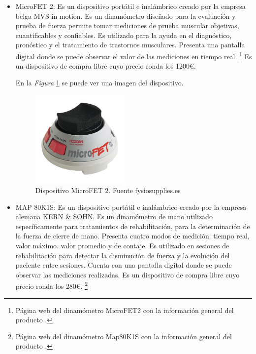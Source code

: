 \begin{itemize}
    \item MicroFET 2: Es un dispositivo portátil e inalámbrico creado por la empresa belga MVS in motion. Es un dinamómetro diseñado para la evaluación y prueba de fuerza permite tomar mediciones de prueba muscular objetivas, cuantificables y confiables. 
    Es utilizado para la ayuda en el diagnóstico, pronóstico y el tratamiento de trastornos musculares. Presenta una pantalla digital donde se puede observar el valor de las mediciones en tiempo real. \cite{microfet}\footnote{Página web del dinamómetro MicroFET2 con la información general del producto \cite{microfet}.}
    Es un dispositivo de compra libre cuyo precio ronda los 1200€. 
    
    En la \textit{Figura} \ref{fig:MicroFET 2} se puede ver una imagen del dispositivo.
    \begin{figure}[h]
        \centering
        \includegraphics[width=0.45\textwidth]{img/MicroFET 2.jpg}
        \caption{Dispositivo MicroFET 2. Fuente fysiosupplies.es}
        \label{fig:MicroFET 2}
    \end{figure}
    
    \item MAP 80K1S: Es un dispositivo portátil e inalámbrico creado por la empresa alemana KERN \& SOHN. Es un dinamómetro de mano utilizado específicamente para tratamientos de rehabilitación, para la determinación de la fuerza de cierre de mano.
    Presenta cuatro modos de medición: tiempo real, valor máximo. valor promedio y de contaje. 
    Es utilizado en sesiones de rehabilitación para detectar la disminución de fuerza y la evolución del paciente entre sesiones. Cuenta con una pantalla digital donde se puede observar las mediciones realizadas. 
    Es un dispositivo de compra libre cuyo precio ronda los 280€. \cite{Map80k1s}\footnote{Página web del dinamómetro Map80K1S con la información general del producto \cite{Map80k1s}.}
    

\end{itemize}
